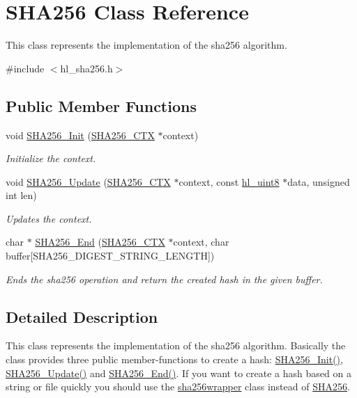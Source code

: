 \hypertarget{class_s_h_a256}{
\section{SHA256 Class Reference}
\label{class_s_h_a256}
}


This class represents the implementation of the sha256 algorithm.  


{\ttfamily \#include $<$hl\_\-sha256.h$>$}\subsection*{Public Member Functions}
\begin{DoxyCompactItemize}
\item 
void \hyperlink{class_s_h_a256_aeb6ef21e200e3ad135d61a97ffa6fb77}{SHA256\_\-Init} (\hyperlink{struct_s_h_a256___c_t_x}{SHA256\_\-CTX} $\ast$context)
\begin{DoxyCompactList}\small\item\em Initialize the context. \item\end{DoxyCompactList}\item 
void \hyperlink{class_s_h_a256_a8538cc8feb0a8edcfc418492311c4494}{SHA256\_\-Update} (\hyperlink{struct_s_h_a256___c_t_x}{SHA256\_\-CTX} $\ast$context, const \hyperlink{hl__types_8h_adc1917ae5f0dc40725be12536ffe0a6c}{hl\_\-uint8} $\ast$data, unsigned int len)
\begin{DoxyCompactList}\small\item\em Updates the context. \item\end{DoxyCompactList}\item 
char $\ast$ \hyperlink{class_s_h_a256_a49aa12cde1048474ded31dd682993b1d}{SHA256\_\-End} (\hyperlink{struct_s_h_a256___c_t_x}{SHA256\_\-CTX} $\ast$context, char buffer\mbox{[}SHA256\_\-DIGEST\_\-STRING\_\-LENGTH\mbox{]})
\begin{DoxyCompactList}\small\item\em Ends the sha256 operation and return the created hash in the given buffer. \item\end{DoxyCompactList}\end{DoxyCompactItemize}


\subsection{Detailed Description}
This class represents the implementation of the sha256 algorithm. Basically the class provides three public member-\/functions to create a hash: \hyperlink{class_s_h_a256_aeb6ef21e200e3ad135d61a97ffa6fb77}{SHA256\_\-Init()}, \hyperlink{class_s_h_a256_a8538cc8feb0a8edcfc418492311c4494}{SHA256\_\-Update()} and \hyperlink{class_s_h_a256_a49aa12cde1048474ded31dd682993b1d}{SHA256\_\-End()}. If you want to create a hash based on a string or file quickly you should use the \hyperlink{classsha256wrapper}{sha256wrapper} class instead of \hyperlink{class_s_h_a256}{SHA256}. 

